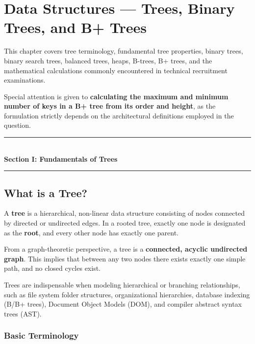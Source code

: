 \chapter{Data Structures --- Trees, Binary Trees, and B+ Trees}
\label{ch:trees_binary_and_bplus}

This chapter covers tree terminology, fundamental tree properties, binary trees, binary search trees, balanced trees, heaps, B-trees, B+ trees, and the mathematical calculations commonly encountered in technical recruitment examinations.

Special attention is given to \textbf{calculating the maximum and minimum number of keys in a B+ tree from its order and height}, as the formulation strictly depends on the architectural definitions employed in the question.

\begin{center}
\vspace{0.5em}
{\color{primary}\rule{0.45\textwidth}{1.2pt}}\\[4pt]
{\Large\bfseries\color{primary} Section I: Fundamentals of Trees}\\[2pt]
{\color{primary}\rule{0.45\textwidth}{1.2pt}}
\vspace{0.5em}
\end{center}

\section{What is a Tree?}

A \textbf{tree} is a hierarchical, non-linear data structure consisting of nodes connected by directed or undirected edges. In a rooted tree, exactly one node is designated as the \textbf{root}, and every other node has exactly one parent.

From a graph-theoretic perspective, a tree is a \textbf{connected, acyclic undirected graph}. This implies that between any two nodes there exists exactly one simple path, and no closed cycles exist.

Trees are indispensable when modeling hierarchical or branching relationships, such as file system folder structures, organizational hierarchies, database indexing (B/B+ trees), Document Object Models (DOM), and compiler abstract syntax trees (AST).

\subsection{Basic Terminology}


